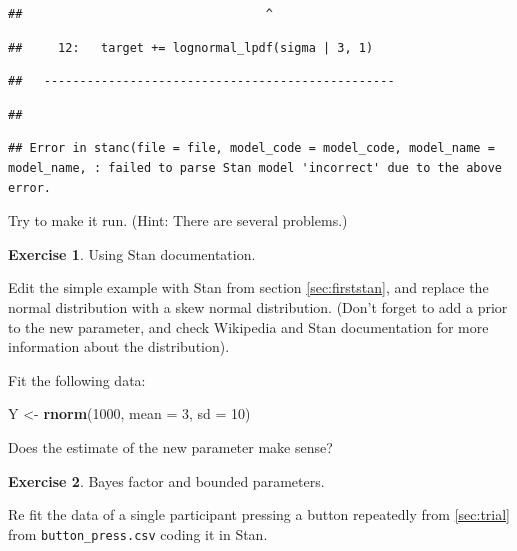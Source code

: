 \documentclass[12pt,]{krantz}
\newenvironment{Shaded}{\begin{snugshade}}{\end{snugshade}}
\newcommand{\DataTypeTok}[1]{\textcolor[rgb]{0.13,0.29,0.53}{#1}}
\newcommand{\DecValTok}[1]{\textcolor[rgb]{0.00,0.00,0.81}{#1}}
\newcommand{\KeywordTok}[1]{\textcolor[rgb]{0.13,0.29,0.53}{\textbf{#1}}}
\newcommand{\NormalTok}[1]{#1}
\newcommand{\StringTok}[1]{\textcolor[rgb]{0.31,0.60,0.02}{#1}}
\theoremstyle{definition}
\theoremstyle{definition}
\theoremstyle{definition}
\newtheorem{exercise}{Exercise}[chapter]
\theoremstyle{remark}
\begin{document}
\begin{verbatim}
##                                  ^
\end{verbatim}

\begin{verbatim}
##     12:   target += lognormal_lpdf(sigma | 3, 1)
\end{verbatim}

\begin{verbatim}
##   -------------------------------------------------
\end{verbatim}

\begin{verbatim}
## 
\end{verbatim}

\begin{verbatim}
## Error in stanc(file = file, model_code = model_code, model_name = model_name, : failed to parse Stan model 'incorrect' due to the above error.
\end{verbatim}

Try to make it run. (Hint: There are several problems.)

\begin{exercise}
\protect\hypertarget{exr:skewstan}{}{\label{exr:skewstan} }Using Stan documentation.
\end{exercise}

Edit the simple example with Stan from section \ref{sec:firststan}, and replace the normal distribution with a skew normal distribution. (Don't forget to add a prior to the new parameter, and check Wikipedia and Stan documentation for more information about the distribution).

Fit the following data:

\begin{Shaded}
\begin{Highlighting}[]
\NormalTok{Y <-}\StringTok{ }\KeywordTok{rnorm}\NormalTok{(}\DecValTok{1000}\NormalTok{, }\DataTypeTok{mean =} \DecValTok{3}\NormalTok{, }\DataTypeTok{sd =} \DecValTok{10}\NormalTok{)}
\end{Highlighting}
\end{Shaded}

Does the estimate of the new parameter make sense?

\begin{exercise}
\protect\hypertarget{exr:lognstan}{}{\label{exr:lognstan} }Bayes factor and bounded parameters.
\end{exercise}

Re fit the data of a single participant pressing a button repeatedly from \ref{sec:trial} from \texttt{button\_press.csv} coding it in Stan.
\end{document}
